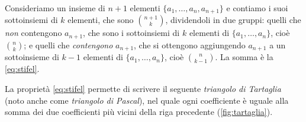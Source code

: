 \begin{osservazione}
Consideriamo un insieme di $n+1$ elementi $\{a_{1},\dots,a_{n},a_{n+1}\}$ e contiamo i
suoi sottoinsiemi di $k$ elementi, che sono $\binom{n+1}{k}$, dividendoli in due gruppi:
quelli che \emph{non} contengono $a_{n+1}$, che sono i sottoinsiemi di $k$ elementi di
$\{a_{1},\dots,a_{n}\}$, cioè $\binom nk$; e quelli che \emph{contengono} $a_{n+1}$, che
si ottengono aggiungendo $a_{n+1}$ a un sottoinsieme di $k-1$ elementi di
$\{a_{1},\dots,a_{n}\}$, cioè $\binom{n}{k-1}$. La somma è la \eqref{eq:stifel}.
\end{osservazione}

La proprietà \eqref{eq:stifel} permette di scrivere il seguente \emph{triangolo di
Tartaglia} (noto anche come \emph{triangolo di Pascal}), nel quale ogni coefficiente è
uguale alla somma dei due coefficienti più vicini della riga precedente
(\cref{fig:tartaglia}).


